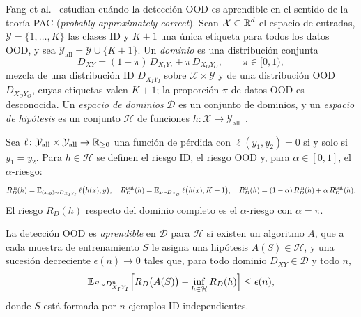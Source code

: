Fang et al.~\cite{fang2022} estudian cuándo la detección OOD es aprendible en el sentido de la teoría PAC (\emph{probably approximately correct}). Sean $\mathcal{X} \subset \mathbb{R}^{d}$ el espacio de entradas, $\mathcal{Y} = \{1, \dots, K\}$ las clases ID y $K + 1$ una única etiqueta para todos los datos OOD, y sea $\mathcal{Y}_{\mathrm{all}} = \mathcal{Y} \cup \{K+1\}$. Un \emph{dominio} es una distribución conjunta
\[
  D_{XY} = (1 - \pi)\, D_{X_I Y_I} + \pi\, D_{X_O Y_O}, \qquad \pi \in [0, 1),
\]
mezcla de una distribución ID $D_{X_I Y_I}$ sobre $\mathcal{X} \times \mathcal{Y}$ y de una distribución OOD $D_{X_O Y_O}$, cuyas etiquetas valen $K+1$; la proporción $\pi$ de datos OOD es desconocida. Un \emph{espacio de dominios} $\mathcal{D}$ es un conjunto de dominios, y un \emph{espacio de hipótesis} es un conjunto $\mathcal{H}$ de funciones $h\colon \mathcal{X} \to \mathcal{Y}_{\mathrm{all}}$~\cite[sec.~2]{fang2022}.

\begin{definicion}\label{def:riesgos-ood}
Sea $\ell\colon \mathcal{Y}_{\mathrm{all}} \times \mathcal{Y}_{\mathrm{all}} \to \mathbb{R}_{\geq 0}$ una función de pérdida con $\ell(y_1, y_2) = 0$ si y solo si $y_1 = y_2$. Para $h \in \mathcal{H}$ se definen el riesgo ID, el riesgo OOD y, para $\alpha \in [0, 1]$, el $\alpha$-riesgo:
\[
  R^{\mathrm{in}}_{D}(h) = \operatorname{\mathbb{E}}_{(x, y) \sim D_{X_I Y_I}} \ell\bigl(h(x), y\bigr), \quad
  R^{\mathrm{out}}_{D}(h) = \operatorname{\mathbb{E}}_{x \sim D_{X_O}} \ell\bigl(h(x), K + 1\bigr), \quad
  R^{\alpha}_{D}(h) = (1 - \alpha)\, R^{\mathrm{in}}_{D}(h) + \alpha\, R^{\mathrm{out}}_{D}(h).
\]
El riesgo $R_D(h)$ respecto del dominio completo es el $\alpha$-riesgo con $\alpha = \pi$.
\end{definicion}

\begin{definicion}\label{def:aprendibilidad}
La detección OOD es \emph{aprendible} en $\mathcal{D}$ para $\mathcal{H}$ si existen un algoritmo $A$, que a cada muestra de entrenamiento $S$ le asigna una hipótesis $A(S) \in \mathcal{H}$, y una sucesión decreciente $\epsilon(n) \to 0$ tales que, para todo dominio $D_{XY} \in \mathcal{D}$ y todo $n$,
\[
  \operatorname{\mathbb{E}}_{S \sim D^{n}_{X_I Y_I}} \Bigl[ R_D\bigl(A(S)\bigr) - \inf_{h \in \mathcal{H}} R_D(h) \Bigr] \leq \epsilon(n),
\]
donde $S$ está formada por $n$ ejemplos ID independientes.
\end{definicion}

